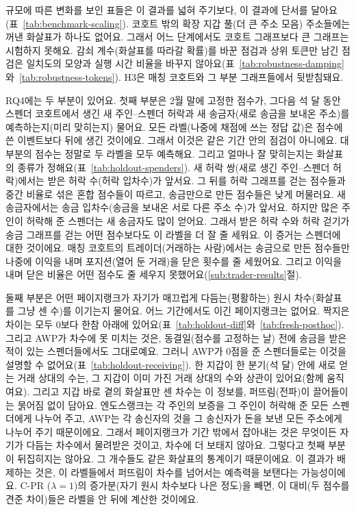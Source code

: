 규모에 따른 변화를 보인 표들은 이 결과를 넓혀 주기보다, 이 결과에 단서를 달아요(표~\ref{tab:benchmark-scaling}). 코호트 밖의 확장 지갑 풀(더 큰 주소 모음) 주소들에는 꺼낸 화살표가 하나도 없어요. 그래서 어느 단계에서도 코호트 그래프보다 큰 그래프는 시험하지 못해요. 감쇠 계수(화살표를 따라갈 확률)를 바꾼 점검과 상위 토큰만 남긴 점검은 일치도의 모양과 실행 시간 비율을 바꾸지 않아요(표~\ref{tab:robustness-damping}와~\ref{tab:robustness-tokens}). H3은 매칭 코호트와 그 부분 그래프들에서 뒷받침돼요.


RQ4에는 두 부분이 있어요. 첫째 부분은 2월 말에 고정한 점수가, 그다음 석 달 동안 스펜더 코호트에서 생긴 새 주인--스펜더 허락과 새 송금자(새로 송금을 보내온 주소)를 예측하는지(미리 맞히는지) 물어요. 모든 라벨(나중에 채점에 쓰는 정답 값)은 점수에 쓴 이벤트보다 뒤에 생긴 것이에요. 그래서 이것은 같은 기간 안의 점검이 아니에요. 대부분의 점수는 정말로 두 라벨을 모두 예측해요. 그리고 얼마나 잘 맞히는지는 화살표의 종류가 정해요(표~\ref{tab:holdout-spenders}). 새 허락 쌍(새로 생긴 주인--스펜더 허락)에서는 받은 허락 수(허락 입차수)가 앞서요. 그 뒤를 허락 그래프를 걷는 점수들과 중간 비율로 섞은 혼합 점수들이 따르고, 송금만으로 만든 점수들은 낮게 머물러요. 새 송금자에서는 송금 입차수(송금을 보내온 서로 다른 주소 수)가 앞서요. 하지만 많은 주인이 허락해 준 스펜더는 새 송금자도 많이 얻어요. 그래서 받은 허락 수와 허락 걷기가 송금 그래프를 걷는 어떤 점수보다도 이 라벨을 더 잘 줄 세워요. 이 증거는 스펜더에 대한 것이에요. 매칭 코호트의 트레이더(거래하는 사람)에서는 송금으로 만든 점수들만 나중에 이익을 내며 포지션(열어 둔 거래)을 닫은 횟수를 줄 세웠어요. 그리고 이익을 내며 닫은 비율은 어떤 점수도 줄 세우지 못했어요(\ref{sub:trader-results}절).

둘째 부분은 어떤 페이지랭크가 자기가 매끄럽게 다듬는(평활하는) 원시 차수(화살표를 그냥 센 수)를 이기는지 물어요. 어느 기간에서도 이긴 페이지랭크는 없어요. 짝지은 차이는 모두 0보다 한참 아래에 있어요(표~\ref{tab:holdout-diff}와~\ref{tab:fresh-posthoc}). 그리고 AWP가 차수에 못 미치는 것은, 동결일(점수를 고정하는 날) 전에 송금을 받은 적이 있는 스펜더들에서도 그대로예요. 그러니 AWP가 0점을 준 스펜더들로는 이것을 설명할 수 없어요(표~\ref{tab:holdout-receiving}). 한 지갑이 한 분기(석 달) 안에 새로 얻는 거래 상대의 수는, 그 지갑이 이미 가진 거래 상대의 수와 상관이 있어요(함께 움직여요). 그리고 지갑 바로 곁의 화살표만 센 차수는 이 정보를, 퍼뜨림(전파)이 끌어들이는 묽어짐 없이 담아요. 엔도스랭크는 각 주인의 보증을 그 주인이 허락해 준 모든 스펜더에게 나누어 주고, AWP는 각 송신자의 것을 그 송신자가 돈을 보낸 모든 주소에게 나누어 주기 때문이에요. 그래서 페이지랭크가 기간 밖에서 잡아내는 것은 무엇이든 자기가 다듬는 차수에서 물려받은 것이고, 차수에 더 보태지 않아요. 그렇다고 첫째 부분이 뒤집히지는 않아요. 그 개수들도 같은 화살표의 통계이기 때문이에요. 이 결과가 배제하는 것은, 이 라벨들에서 퍼뜨림이 차수를 넘어서는 예측력을 보탠다는 가능성이에요. C-PR ($\lambda=1$)의 증가분(자기 원시 차수보다 나은 정도)을 빼면, 이 대비(두 점수를 견준 차이)들은 라벨을 안 뒤에 계산한 것이에요.

